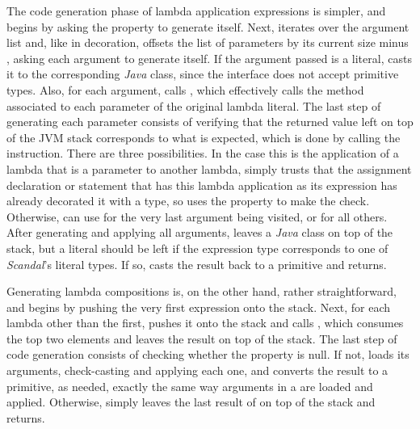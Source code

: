 The code generation phase of lambda application expressions is simpler, and begins by asking the  property to generate itself. Next,  iterates over the argument list and, like in decoration, offsets the list of parameters by its current size minus , asking each argument to generate itself. If the argument passed is a literal,  casts it to the corresponding \emph{Java} class, since the  interface does not accept primitive types. Also, for each argument,  calls , which effectively calls the method associated to each parameter of the original lambda literal. The last step of generating each parameter consists of verifying that the returned value left on top of the JVM stack corresponds to what is expected, which is done by calling the  instruction. There are three possibilities. In the case this is the application of a lambda that is a parameter to another lambda,  simply trusts that the assignment declaration or statement that has this lambda application as its expression has already decorated it with a type, so  uses the  property to make the check. Otherwise,  can use  for the very last argument being visited, or  for all others. After generating and applying all arguments,  leaves a \emph{Java} class on top of the stack, but a literal should be left if the expression type corresponds to one of \emph{Scandal}'s literal types. If so,  casts the result back to a primitive and returns.

Generating lambda compositions is, on the other hand, rather straightforward, and begins by pushing the very first expression onto the stack. Next, for each lambda other than the first,  pushes it onto the stack and calls , which consumes the top two elements and leaves the result on top of the stack. The last step of code generation consists of checking whether the  property is null. If not,  loads its arguments, check-casting and applying each one, and converts the result to a primitive, as needed, exactly the same way arguments in a  are loaded and applied. Otherwise,  simply leaves the last result of  on top of the stack and returns.